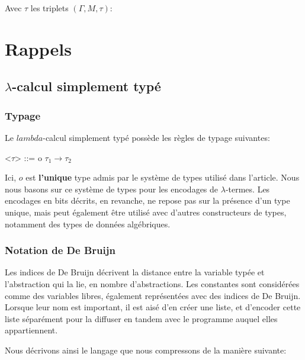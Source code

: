 \documentclass[titlepage]{article}
\begin{document}
Avec \(\tau\) les triplets \((\Gamma, M, \tau)\):


\section{Rappels}\label{conventions-de-larticle}

\subsection{$\lambda$-calcul simplement typé}\label{lambda-calcul-simplement-typuxe9}

\subsubsection{Typage}\label{typage}

Le \(lambda\)-calcul simplement typé possède les règles de typage
suivantes:

\begin{grammar}

\let\syntleft\relax
\let\syntright\relax

<$\tau$> ::= o
\alt $\tau_1 \rightarrow \tau_2$

\end{grammar}

Ici, \(o\) est \textbf{l'unique} type admis par le système de types
utilisé dans l'article. Nous nous basons sur ce système de types pour
les encodages de \(\lambda\)-termes. Les encodages en bits décrits, en
revanche, ne repose pas sur la présence d'un type unique, mais peut
également être utilisé avec d'autres constructeurs de types, notamment
des types de données algébriques.

\subsubsection{Notation de De Bruijn}\label{notation-de-de-bruijn}

Les indices de De Bruijn décrivent la distance entre la variable typée
et l'abstraction qui la lie, en nombre d'abstractions. Les constantes
sont considérées comme des variables libres, également représentées avec
des indices de De Bruijn. Lorsque leur nom est important, il est aisé
d'en créer une liste, et d'encoder cette liste séparément pour la
diffuser en tandem avec le programme auquel elles appartiennent.

Nous décrivons ainsi le langage que nous compressons de la manière
suivante:
\end{document}
